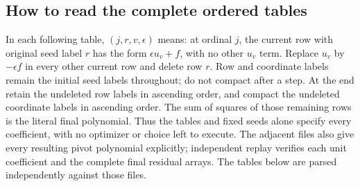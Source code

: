 \subsection{How to read the complete ordered tables}
In each following table, $(j,r,v,\epsilon)$ means: at ordinal $j$, the current row with original seed label $r$ has the form $\epsilon u_v+f$, with no other $u_v$ term. Replace $u_v$ by $-\epsilon f$ in every other current row and delete row $r$. Row and coordinate labels remain the initial seed labels throughout; do not compact after a step. At the end retain the undeleted row labels in ascending order, and compact the undeleted coordinate labels in ascending order. The sum of squares of those remaining rows is the literal final polynomial. Thus the tables and fixed seeds alone specify every coefficient, with no optimizer or choice left to execute.
The adjacent  files also give every resulting pivot polynomial explicitly; independent replay verifies each unit coefficient and the complete final residual arrays. The tables below are parsed independently against those files.
